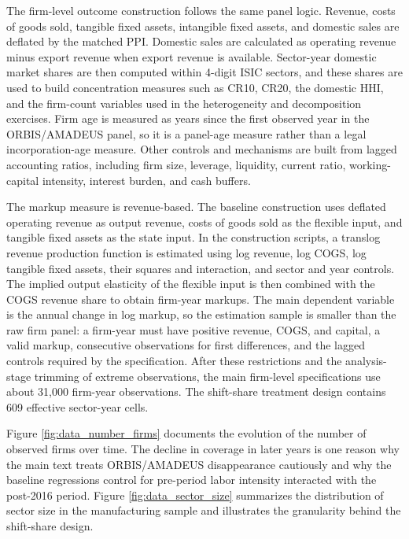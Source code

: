 ﻿\documentclass[12pt]{article}
\begin{document}
The firm-level outcome construction follows the same panel logic. Revenue, costs of goods sold, tangible fixed assets, intangible fixed assets, and domestic sales are deflated by the matched PPI. Domestic sales are calculated as operating revenue minus export revenue when export revenue is available. Sector-year domestic market shares are then computed within 4-digit ISIC sectors, and these shares are used to build concentration measures such as CR10, CR20, the domestic HHI, and the firm-count variables used in the heterogeneity and decomposition exercises. Firm age is measured as years since the first observed year in the ORBIS/AMADEUS panel, so it is a panel-age measure rather than a legal incorporation-age measure. Other controls and mechanisms are built from lagged accounting ratios, including firm size, leverage, liquidity, current ratio, working-capital intensity, interest burden, and cash buffers.

The markup measure is revenue-based. The baseline construction uses deflated operating revenue as output revenue, costs of goods sold as the flexible input, and tangible fixed assets as the state input. In the construction scripts, a translog revenue production function is estimated using log revenue, log COGS, log tangible fixed assets, their squares and interaction, and sector and year controls. The implied output elasticity of the flexible input is then combined with the COGS revenue share to obtain firm-year markups. The main dependent variable is the annual change in log markup, so the estimation sample is smaller than the raw firm panel: a firm-year must have positive revenue, COGS, and capital, a valid markup, consecutive observations for first differences, and the lagged controls required by the specification. After these restrictions and the analysis-stage trimming of extreme observations, the main firm-level specifications use about 31,000 firm-year observations. The shift-share treatment design contains 609 effective sector-year cells.

Figure \ref{fig:data_number_firms} documents the evolution of the number of observed firms over time. The decline in coverage in later years is one reason why the main text treats ORBIS/AMADEUS disappearance cautiously and why the baseline regressions control for pre-period labor intensity interacted with the post-2016 period. Figure \ref{fig:data_sector_size} summarizes the distribution of sector size in the manufacturing sample and illustrates the granularity behind the shift-share design.
\end{document}
